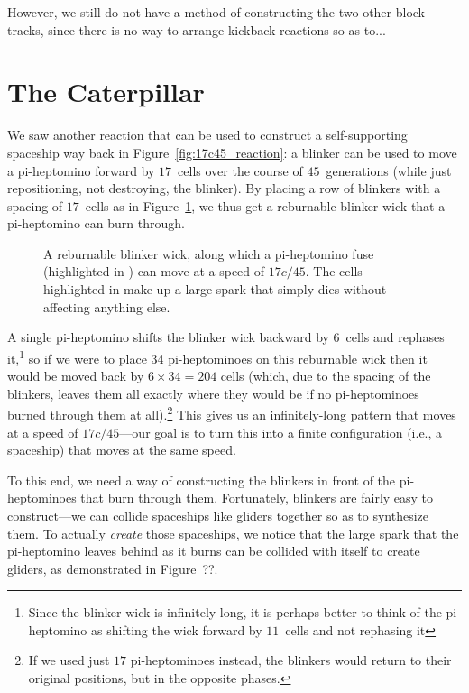 However, we still do not have a method of constructing the two other block tracks, since there is no way to arrange kickback reactions so as to...


\section{The Caterpillar}\label{sec:caterpillar}

We saw another reaction that can be used to construct a self-supporting spaceship way back in Figure~\ref{fig:17c45_reaction}: a blinker can be used to move a pi-heptomino forward by $17$~cells over the course of $45$~generations (while just repositioning, not destroying, the blinker). By placing a row of blinkers with a spacing of $17$~cells as in Figure~\ref{fig:reburnable_blinker_wick}, we thus get a reburnable blinker wick that a pi-heptomino can burn through.

\begin{figure}[!htb]
	\centering
	\caption{A reburnable blinker wick, along which a pi-heptomino fuse (highlighted in ) can move at a speed of $17c/45$. The cells highlighted in  make up a large spark that simply dies without affecting anything else.}\label{fig:reburnable_blinker_wick}
\end{figure}


A single pi-heptomino shifts the blinker wick backward by $6$~cells and rephases it,\footnote{Since the blinker wick is infinitely long, it is perhaps better to think of the pi-heptomino as shifting the wick forward by $11$~cells and not rephasing it} so if we were to place 34 pi-heptominoes on this reburnable wick then it would be moved back by $6 \times 34 = 204$ cells (which, due to the spacing of the blinkers, leaves them all exactly where they would be if no pi-heptominoes burned through them at all).\footnote{If we used just $17$ pi-heptominoes instead, the blinkers would return to their original positions, but in the opposite phases.} This gives us an infinitely-long pattern that moves at a speed of $17c/45$---our goal is to turn this into a finite configuration (i.e., a spaceship) that moves at the same speed.

To this end, we need a way of constructing the blinkers in front of the pi-heptominoes that burn through them. Fortunately, blinkers are fairly easy to construct---we can collide spaceships like gliders together so as to synthesize them. To actually \emph{create} those spaceships, we notice that the large spark that the pi-heptomino leaves behind as it burns can be collided with itself to create gliders, as demonstrated in Figure~??.

